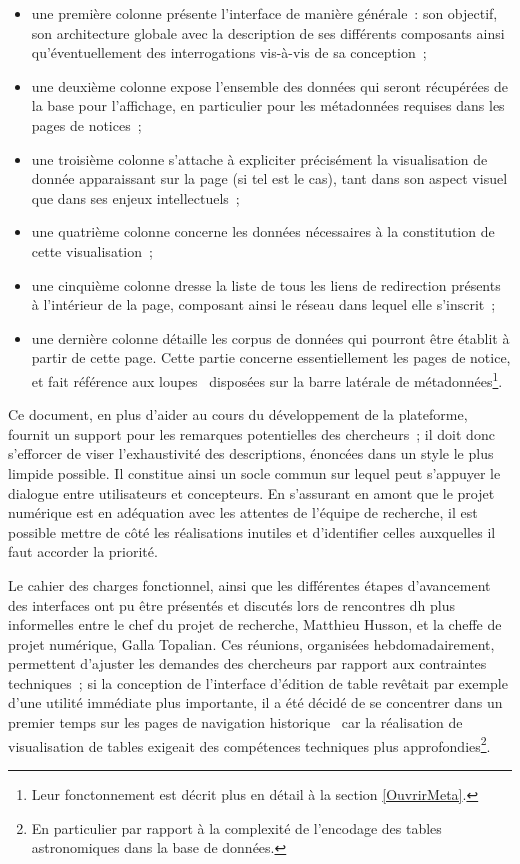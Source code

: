 \documentclass[a4paper,12pt,twoside]{book}
\newcommand{\bdd}{base de données\xspace}
\newcommand{\g}[1]{\og#1~\fg}
\newcommand{\dhu}{\gls{dh}\xspace}
\begin{document}
\begin{itemize}
	\item une première colonne présente l'interface de manière générale~: son objectif, son architecture globale avec la description de ses différents composants ainsi qu'éventuellement des interrogations vis-à-vis de sa conception~;
	\item une deuxième colonne expose l'ensemble des données qui seront récupérées de la base pour l'affichage, en particulier pour les métadonnées requises dans les pages de notices~;
	\item une troisième colonne s'attache à expliciter précisément la visualisation de donnée apparaissant sur la page (si tel est le cas), tant dans son aspect visuel que dans ses enjeux intellectuels~;
	\item une quatrième colonne concerne les données nécessaires à la constitution de cette visualisation~;
	\item une cinquième colonne dresse la liste de tous les liens de redirection présents à l'intérieur de la page, composant ainsi le réseau dans lequel elle s'inscrit~;
	\item une dernière colonne détaille les corpus de données qui pourront être établit à partir de cette page. Cette partie concerne essentiellement les pages de notice, et fait référence aux \g{loupes} disposées sur la barre latérale de métadonnées\footnote{Leur fonctonnement est décrit plus en détail à la section \ref{OuvrirMeta}.}.
\end{itemize}

Ce document, en plus d'aider au cours du développement de la plateforme, fournit un support pour les remarques potentielles des chercheurs~; il doit donc s'efforcer de viser l'exhaustivité des descriptions, énoncées dans un style le plus limpide possible. Il constitue ainsi un socle commun sur lequel peut s'appuyer le dialogue entre utilisateurs et concepteurs. En s'assurant en amont que le projet numérique est en adéquation avec les attentes de l'équipe de recherche, il est possible mettre de côté les réalisations inutiles et d'identifier celles auxquelles il faut accorder la priorité.

Le cahier des charges fonctionnel, ainsi que les différentes étapes d'avancement des interfaces ont pu être présentés et discutés lors de rencontres \dhu plus informelles entre le chef du projet de recherche, Matthieu Husson, et la cheffe de projet numérique, Galla Topalian. Ces réunions, organisées hebdomadairement, permettent d'ajuster les demandes des chercheurs par rapport aux contraintes techniques~; si la conception de l'interface d'édition de table revêtait par exemple d'une utilité immédiate plus importante, il a été décidé de se concentrer dans un premier temps sur les pages de \g{navigation historique} car la réalisation de visualisation de tables exigeait des compétences techniques plus approfondies\footnote{En particulier par rapport à la complexité de l'encodage des tables astronomiques dans la \bdd.}.
\end{document}
